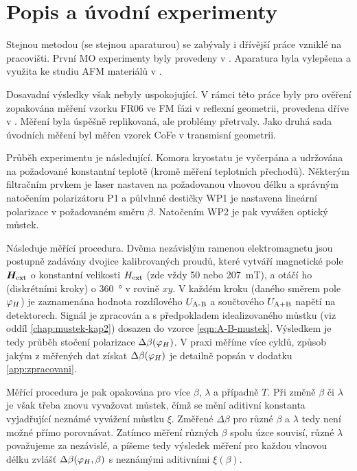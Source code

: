 \section{Popis a úvodní experimenty}
\label{chap:vychozi-situace}

Stejnou metodou (se stejnou aparaturou) se zabývaly i dřívější práce vzniklé na pracovišti.
První MO experimenty byly provedeny v \cite{wohlrathMagnetooptickaCharakterizaceSpintronickych2018}. 
Aparatura byla vylepšena a využita ke studiu AFM materiálů v \cite{kubascikMagnetooptickeStudiumAntiferomagnetickych2019,kimakOptickaSpektroskopieAntiferomagnetu2019}.

Dosavadní výsledky však nebyly uspokojující.
V rámci této práce byly pro ověření zopakována měření vzorku FR06 ve FM fázi v reflexní geometrii, provedena dříve v \cite{kubascikMagnetooptickeStudiumAntiferomagnetickych2019}.
Měření byla úspěšně replikovaná, ale problémy přetrvaly.
Jako druhá sada úvodních měření byl měřen vzorek CoFe v transmisní geometrii.

Průběh experimentu je následující.
Komora kryostatu je vyčerpána a udržována na požadované konstantní teplotě (kromě měření teplotních přechodů).
Některým filtračním prvkem je laser nastaven na požadovanou vlnovou délku a správným natočením polarizátoru P1 a půlvlnné destičky WP1 je nastavena lineární polarizace v požadovaném směru $\beta$.
Natočením WP2 je pak vyvážen optický můstek.

Následuje měřící procedura. 
Dvěma nezávislým ramenou elektromagnetu jsou postupně zadávány dvojice kalibrovaných proudů, které vytváří magnetické pole $\bm{H}_\textrm{ext}$ o konstantní velikosti $H_\textrm{ext}$ (zde vždy \num{50} nebo \SI{207}{\milli\tesla}), a otáčí ho (diskrétními kroky) o \SI{360}{\degree} v rovině $xy$.
V každém kroku (daného směrem pole $\varphi_H$) je zaznamenána hodnota rozdílového $U_\textrm{A-B}$ a součtového $U_\textrm{A+B}$ napětí na detektorech.
Signál je zpracován a s předpokladem idealizovaného můstku (viz oddíl \ref{chap:mustek-kap2}) dosazen do vzorce \eqref{eqn:A-B-mustek}.
Výsledkem je tedy průběh stočení polarizace $\Delta\beta(\varphi_H)$.
V praxi měříme více cyklů, způsob jakým z měřených dat získat $\Delta\beta(\varphi_H)$ je detailně popsán v dodatku \ref{app:zpracovani}.

Měřící procedura je pak opakována pro více $\beta$, $\lambda$ a případně $T$.
Při změně $\beta$ či $\lambda$ je však třeba znovu vyvažovat můstek, čímž se mění aditivní konstanta vyjadřující neznámé vyvážení můstku $\xi$.
Změřené $\Delta\beta$ pro různé $\beta$ a $\lambda$ tedy není možné přímo porovnávat.
Zatímco měření různých $\beta$ spolu úzce souvisí, různé $\lambda$ považujeme za nezávislé, a píšeme tedy výsledek měření pro každou vlnovou délku zvlášť $\Delta\beta(\varphi_H, \beta)$ s neznámými aditivními $\xi(\beta)$.

